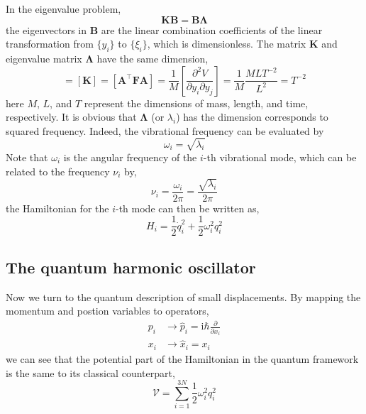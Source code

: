 \documentclass[a4paper,notitlepage,preprint]{revtex4-1}
\newcommand\mbf{\mathbf}
\newcommand\mrm{\mathrm}
\newcommand\mcr{\mathscr}
\begin{document}
In the eigenvalue problem,
\begin{equation}
	\mbf{KB} = \mbf{B}\bm\Lambda
	\label{eq:eig}
\end{equation}
\noindent the eigenvectors in $\mbf{B}$ are the linear combination coefficients of the linear transformation from $\{y_i\}$ to $\{\xi_i\}$, which is dimensionless. The matrix $\mbf{K}$ and eigenvalue matrix $\bm\Lambda$ have the same dimension,
\begin{equation}
	[\bm\Lambda] = \left[\mbf{K}\right] = \left[\mbf{A}^\top \mbf{FA}\right] = \frac{1}{M}\left[\frac{\partial^2 V}{\partial y_i \partial y_j}\right] = \frac{1}{M} \frac{MLT^{-2}}{L^2} = T^{-2}
	\label{eq:lambda_dimension}
\end{equation}
\noindent here $M$, $L$, and $T$ represent the dimensions of mass, length, and time, respectively. It is obvious that $\bm\Lambda$ (or $\lambda_i$) has the dimension corresponds to squared frequency. Indeed, the vibrational frequency can be evaluated by
\begin{equation}
	\omega_i = \sqrt{\lambda_i}
	\label{eq:freq}
\end{equation}
\noindent Note that $\omega_i$ is the angular frequency of the $i$-th vibrational mode, which can be related to the frequency $\nu_i$ by,
\begin{equation}
	\nu_i = \frac{\omega_i}{2\pi} = \frac{\sqrt{\lambda_i}}{2\pi}
	\label{eq:freq2pi}
\end{equation}
\noindent the Hamiltonian for the $i$-th mode can then be written as,
\begin{equation}
	H_i = \frac{1}{2}\dot{q}_i^2 + \frac{1}{2}\omega_i^2 q_i^2
	\label{eq:Hqomega}
\end{equation}

\subsection{The quantum harmonic oscillator}
Now we turn to the quantum description of small displacements. By mapping the momentum and postion variables to operators,
\begin{subequations}
	\begin{alignat}{2}
	p_i &\rightarrow \hat{p}_i = \mrm{i}\hbar \frac{\partial}{\partial x_i} \\
	x_i &\rightarrow \hat{x}_i = x_i
	\end{alignat}
\label{eq:var_to_op}
\end{subequations}
{\noindent}we can see that the potential part of the Hamiltonian in the quantum framework is the same to its classical counterpart,
\begin{equation}
	\mcr{V} = \sum_{i=1}^{3N} \frac{1}{2}\omega_i^2 q_i^2
	\label{eq:V_q_q}
\end{equation}
\end{document}
